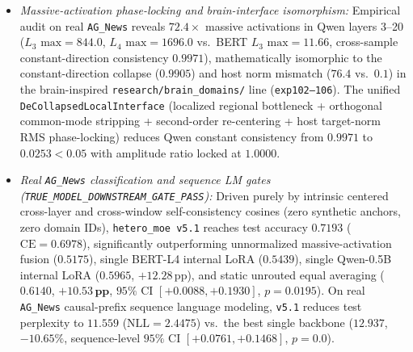 \documentclass[10pt,twoside]{article}
\theoremstyle{definition}
\theoremstyle{plain}
\theoremstyle{remark}
\begin{document}
\begin{enumerate}[leftmargin=1.6em, itemsep=1pt, parsep=0pt]
\begin{itemize}[leftmargin=1.4em, itemsep=0.5pt, parsep=0pt]
        \item \emph{Massive-activation phase-locking and brain-interface isomorphism:} Empirical audit on real \texttt{AG\_News} reveals $72.4\times$ massive activations in Qwen layers 3--20 ($L_3\text{ max}=844.0$, $L_4\text{ max}=1696.0$ vs.\ BERT $L_3\text{ max}=11.66$, cross-sample constant-direction consistency $0.9971$), mathematically isomorphic to the constant-direction collapse ($0.9905$) and host norm mismatch ($76.4$ vs.\ $0.1$) in the brain-inspired \texttt{research/brain\_domains/} line (\texttt{exp102--106}). The unified \texttt{DeCollapsedLocalInterface} (localized regional bottleneck + orthogonal common-mode stripping + second-order re-centering + host target-norm RMS phase-locking) reduces Qwen constant consistency from $0.9971$ to $\mathbf{0.0253} < 0.05$ with amplitude ratio locked at $\mathbf{1.0000}$.
        \item \emph{Real \texttt{AG\_News} classification and sequence LM gates (\texttt{TRUE\_MODEL\_DOWNSTREAM\_GATE\_PASS}):} Driven purely by intrinsic centered cross-layer and cross-window self-consistency cosines (zero synthetic anchors, zero domain IDs), \texttt{hetero\_moe v5.1} reaches test accuracy $\mathbf{0.7193}$ ($\mathrm{CE}=0.6978$), significantly outperforming unnormalized massive-activation fusion ($0.5175$), single BERT-L4 internal LoRA ($0.5439$), single Qwen-0.5B internal LoRA ($0.5965$, $+12.28\,\text{pp}$), and static unrouted equal averaging ($0.6140$, $\mathbf{+10.53\,\text{pp}}$, $95\%$ CI $[+0.0088, +0.1930]$, $p{=}0.0195$). On real \texttt{AG\_News} causal-prefix sequence language modeling, \texttt{v5.1} reduces test perplexity to $\mathbf{11.559}$ ($\mathrm{NLL}=2.4475$) vs.\ the best single backbone ($12.937$, $\mathbf{-10.65\%}$, sequence-level $95\%$ CI $[+0.0761, +0.1468]$, $p{=}0.0$).
    \end{itemize}
\end{enumerate}
\end{document}
